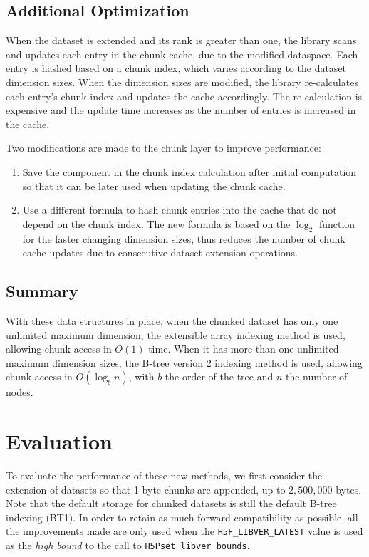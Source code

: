 \subsection{Additional Optimization}
When the dataset is extended and its rank is greater than one, the library scans
and updates each entry in the chunk cache, due to the modified dataspace.
Each entry is hashed based on a chunk index, which varies according to the
dataset dimension sizes. When the dimension sizes are modified, the library
re-calculates each entry's chunk index and updates the cache accordingly.
The re-calculation is expensive and the update time increases as the number of
entries is increased in the cache.

Two modifications are made to the chunk layer to improve performance:
\begin{enumerate}
\item Save the component in the chunk index calculation after
initial computation so that it can be later used when updating the chunk cache.
\item Use a different formula to hash chunk entries into the cache that do not depend
on the chunk index. The new formula is based on the $\log_2$ function
for the faster changing dimension sizes, thus reduces the number of chunk cache
updates due to consecutive dataset extension operations.
\end{enumerate}

\subsection{Summary}

With these data structures in place, when the chunked dataset has only one
unlimited maximum dimension, the extensible array indexing method is used,
allowing chunk access in $O(1)$ time. When it has more than one unlimited
maximum dimension sizes, the B-tree version 2 indexing method is used, allowing
chunk access in $O(\log_b{n})$, with $b$ the order of the tree and $n$ the
number of nodes.

\section{Evaluation}
\label{sec:evaluation}

To evaluate the performance of these new methods, we first consider the extension
of datasets so that 1-byte chunks are appended, up to $2,500,000$ bytes.
Note that the default storage for chunked datasets is still the default
B-tree indexing (BT1). In order to retain as much forward compatibility as
possible, all the improvements made are only used when the
\texttt{H5F\_LIBVER\_LATEST} value is used as the \textit{high bound} to the
call to \texttt{H5Pset\_libver\_bounds}. 

